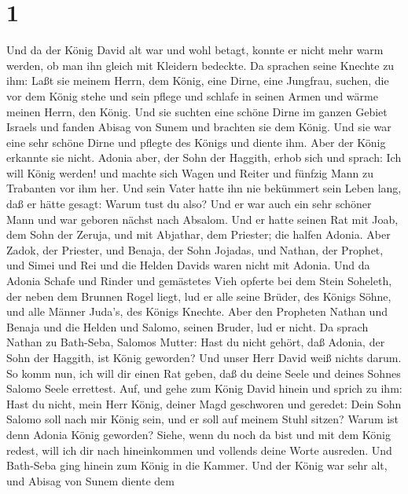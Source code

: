 \hypertarget{section}{%
\section{1}\label{section}}

 Und da der König David alt war und wohl betagt, konnte er
nicht mehr warm werden, ob man ihn gleich mit Kleidern bedeckte.
 Da sprachen seine Knechte zu ihm: Laßt sie meinem Herrn,
dem König, eine Dirne, eine Jungfrau, suchen, die vor dem König stehe
und sein pflege und schlafe in seinen Armen und wärme meinen Herrn, den
König.  Und sie suchten eine schöne Dirne im ganzen Gebiet
Israels und fanden Abisag von Sunem und brachten sie dem König.
 Und sie war eine sehr schöne Dirne und pflegte des Königs
und diente ihm. Aber der König erkannte sie nicht.  Adonia
aber, der Sohn der Haggith, erhob sich und sprach: Ich will König
werden! und machte sich Wagen und Reiter und fünfzig Mann zu Trabanten
vor ihm her.  Und sein Vater hatte ihn nie bekümmert sein
Leben lang, daß er hätte gesagt: Warum tust du also? Und er war auch ein
sehr schöner Mann und war geboren nächst nach Absalom.  Und
er hatte seinen Rat mit Joab, dem Sohn der Zeruja, und mit Abjathar, dem
Priester; die halfen Adonia.  Aber Zadok, der Priester, und
Benaja, der Sohn Jojadas, und Nathan, der Prophet, und Simei und Rei und
die Helden Davids waren nicht mit Adonia.  Und da Adonia
Schafe und Rinder und gemästetes Vieh opferte bei dem Stein Soheleth,
der neben dem Brunnen Rogel liegt, lud er alle seine Brüder, des Königs
Söhne, und alle Männer Juda's, des Königs Knechte.  Aber
den Propheten Nathan und Benaja und die Helden und Salomo, seinen
Bruder, lud er nicht.  Da sprach Nathan zu Bath-Seba,
Salomos Mutter: Hast du nicht gehört, daß Adonia, der Sohn der Haggith,
ist König geworden? Und unser Herr David weiß nichts darum.
 So komm nun, ich will dir einen Rat geben, daß du deine
Seele und deines Sohnes Salomo Seele errettest.  Auf, und
gehe zum König David hinein und sprich zu ihm: Hast du nicht, mein Herr
König, deiner Magd geschworen und geredet: Dein Sohn Salomo soll nach
mir König sein, und er soll auf meinem Stuhl sitzen? Warum ist denn
Adonia König geworden?  Siehe, wenn du noch da bist und mit
dem König redest, will ich dir nach hineinkommen und vollends deine
Worte ausreden.  Und Bath-Seba ging hinein zum König in die
Kammer. Und der König war sehr alt, und Abisag von Sunem diente dem

